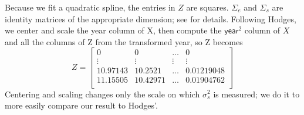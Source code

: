\documentclass{report}
\newcommand{\textcompute}{\textsf}
\newcommand{\sigssq}{\sigma_s^2}
\begin{document}
Because we fit a quadratic spline, the entries in $Z$ are squares.  $\Sigma_e$ and $\Sigma_s$ are identity matrices of the appropriate dimension; see \cite{hodges:2013} for details.  Following Hodges, we center and scale the \textcompute{year} column of X, then compute the $\textcompute{year}^2$ column of $X$ and all the columns of Z from the transformed \textcompute{year}, so Z becomes
\begin{equation*}
Z =	\begin{bmatrix} 
		0 & 0 & \dots & 0\\
		\vdots & \vdots & \vdots & \vdots\\
		10.97143 & 10.2521 & \dots & 0.01219048\\
		11.15505 & 10.42971 & \dots & 0.01904762\\
	\end{bmatrix}
\end{equation*}
Centering and scaling changes only the scale on which $\sigssq$ is measured; we do it to more easily compare our result to Hodges'.
\end{document}
